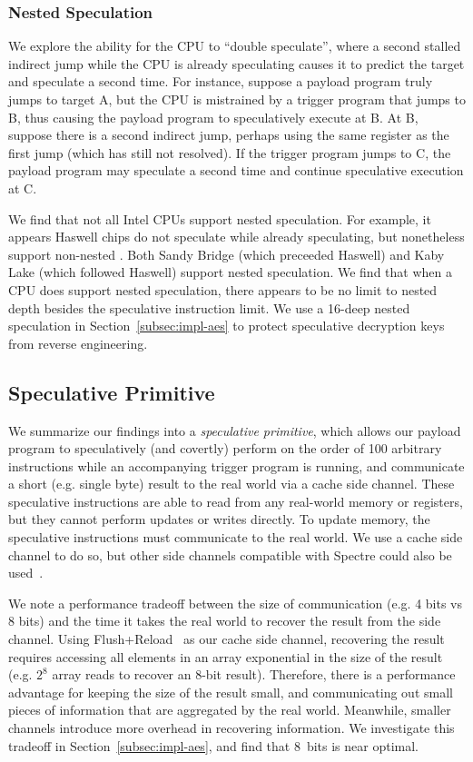 \subsubsection{Nested Speculation}

We explore the ability for the CPU to ``double speculate'', where a second
stalled indirect jump while the CPU is already speculating causes it to predict
the target and
speculate a second time. For instance, suppose a payload program truly jumps to
target A, but the CPU is mistrained by a trigger program that jumps to B, thus
causing the payload program to speculatively execute at B. At B, suppose there
is a second indirect jump, perhaps using the same register as the first jump
(which has still not resolved). If the trigger program jumps to C, the payload
program may speculate a second time and continue speculative execution at C.

We find that not all Intel CPUs support nested speculation. For
example, it appears Haswell chips do not speculate while already speculating,
but nonetheless support non-nested \speculake. Both Sandy Bridge (which
preceeded Haswell) and Kaby Lake (which followed Haswell) support nested
speculation. We find that when a CPU does support nested speculation, there
appears to be no limit to nested depth besides the speculative instruction
limit. We use a 16-deep nested speculation in Section~\ref{subsec:impl-aes}
to protect speculative decryption keys from reverse
engineering.

\subsection{Speculative Primitive}

We summarize our findings into a \emph{speculative primitive}, which allows our payload program to
speculatively (and covertly) perform on the order of 100 arbitrary
instructions while an accompanying trigger program is running, and communicate
a short (e.g. single byte) result to the real
world via a cache side channel. These speculative instructions are able to read
from any real-world memory or registers, but they cannot perform updates or
writes directly. To update memory, the speculative instructions must communicate
to the real world. We use a cache side channel to do so, but other side channels
compatible with Spectre could also be used~\cite{spectre1-1}.

We note a performance tradeoff between the size of communication (e.g. 4 bits vs 8
bits) and the time it takes the real world to recover the result from the side
channel. Using Flush+Reload~\cite{yarom2014flush+} as our cache side channel,
recovering the result requires accessing all elements in an array exponential in
the size of the result (e.g. $2^8$ array reads to recover an 8-bit result).
Therefore, there is a
performance advantage for keeping the size of the result small, and communicating
out small pieces of information that are aggregated by the real world.
Meanwhile, smaller channels introduce more overhead in recovering information. We
investigate this tradeoff in Section~\ref{subsec:impl-aes}, and find that 8~bits
is near optimal.

